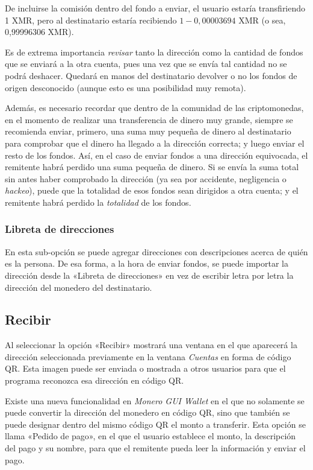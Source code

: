 \documentclass[12pt,a4paper,twoside]{book}
\begin{document}
De incluirse la comisión dentro del fondo a enviar, el usuario estaría transfiriendo 1 XMR, pero al destinatario estaría recibiendo $ 1 - 0,00003694 $ XMR (o sea, 0,99996306 XMR).

Es de extrema importancia \textit{revisar} tanto la dirección como la cantidad de fondos que se enviará a la otra cuenta, pues una vez que se envía tal cantidad no se podrá deshacer. Quedará en manos del destinatario devolver o no los fondos de origen desconocido (aunque esto es una posibilidad muy remota).

Además, es necesario recordar que dentro de la comunidad de las criptomonedas, en el momento de realizar una transferencia de dinero muy grande, siempre se recomienda enviar, primero, una suma muy pequeña de dinero al destinatario para comprobar que el dinero ha llegado a la dirección correcta; y luego enviar el resto de los fondos. Así, en el caso de enviar fondos a una dirección equivocada, el remitente habrá perdido una suma pequeña de dinero. Si se envía la suma total sin antes haber comprobado la dirección (ya sea por accidente, negligencia o \textit{hackeo}), puede que la totalidad de esos fondos sean dirigidos a otra cuenta; y el remitente habrá perdido la \textit{totalidad} de los fondos.

\subsubsection{Libreta de direcciones}
En esta sub-opción se puede agregar direcciones con descripciones acerca de quién es la persona. De esa forma, a la hora de enviar fondos, se puede importar la dirección desde la «Libreta de direcciones» en vez de escribir letra por letra la dirección del monedero del destinatario.

\subsection{Recibir}
Al seleccionar la opción «Recibir» mostrará una ventana en el que aparecerá la dirección seleccionada previamente en la ventana \textit{Cuentas} en forma de código QR. Esta imagen puede ser enviada o mostrada a otros usuarios para que el programa reconozca esa dirección en código QR.

Existe una nueva funcionalidad en \textit{Monero GUI Wallet} en el que no solamente se puede convertir la dirección del monedero en código QR, sino que también se puede designar dentro del mismo código QR el monto a transferir. Esta opción se llama «Pedido de pago», en el que el usuario establece el monto, la descripción del pago y su nombre, para que el remitente pueda leer la información y enviar el pago.
\end{document}
